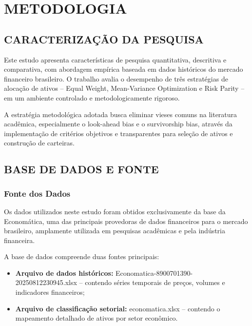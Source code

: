 
\chapter{METODOLOGIA}

\section{CARACTERIZAÇÃO DA PESQUISA}

Este estudo apresenta características de pesquisa quantitativa, descritiva e comparativa, com abordagem empírica baseada em dados históricos do mercado financeiro brasileiro. O trabalho avalia o desempenho de três estratégias de alocação de ativos -- Equal Weight, Mean-Variance Optimization e Risk Parity -- em um ambiente controlado e metodologicamente rigoroso.

A estratégia metodológica adotada busca eliminar vieses comuns na literatura acadêmica, especialmente o look-ahead bias e o survivorship bias, através da implementação de critérios objetivos e transparentes para seleção de ativos e construção de carteiras.

\section{BASE DE DADOS E FONTE}

\subsection{Fonte dos Dados}

Os dados utilizados neste estudo foram obtidos exclusivamente da base da Economática, uma das principais provedoras de dados financeiros para o mercado brasileiro, amplamente utilizada em pesquisas acadêmicas e pela indústria financeira.

A base de dados compreende duas fontes principais:
\begin{itemize}
    \item \textbf{Arquivo de dados históricos:} Economatica-8900701390-20250812230945.xlsx -- contendo séries temporais de preços, volumes e indicadores financeiros;
    \item \textbf{Arquivo de classificação setorial:} economatica.xlsx -- contendo o mapeamento detalhado de ativos por setor econômico.
\end{itemize}


